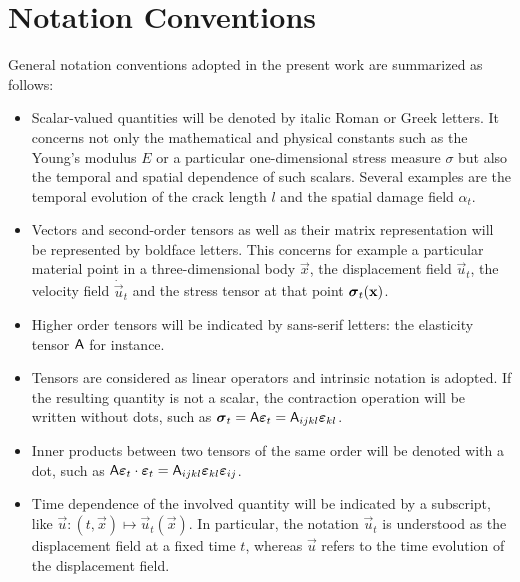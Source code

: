 \section*{Notation Conventions}
General notation conventions adopted in the present work are summarized as follows:
\begin{itemize}
\item Scalar-valued quantities will be denoted by italic Roman or Greek letters. It concerns not only the mathematical and physical constants such as the Young's modulus $E$ or a particular one-dimensional stress measure $\sigma$ but also the temporal and spatial dependence of such scalars. Several examples are the temporal evolution of the crack length $l$ and the spatial damage field $\alpha_t$.

\item Vectors and second-order tensors as well as their matrix representation will be represented by boldface letters. This concerns for example a particular material point in a three-dimensional body $\vec{x}$, the displacement field $\vec{u}_t$, the velocity field $\dot{\vec{u}}_t$ and the stress tensor at that point $\sig_t(\vec{x})$.

\item Higher order tensors will be indicated by sans-serif letters: the elasticity tensor $\mathsf{A}$ for instance.

\item Tensors are considered as linear operators and intrinsic notation is adopted. If the resulting quantity is not a scalar, the contraction operation will be written without dots, such as $\sig_t=\tens{A}\eps_t=\tens{A}_{ijkl}\eps_{kl}$.

\item Inner products between two tensors of the same order will be denoted with a dot, such as $\tens{A}\eps_t\cdot\eps_t=\tens{A}_{ijkl}\eps_{kl}\eps_{ij}$.

\item Time dependence of the involved quantity will be indicated by a subscript, like $\vec{u}:(t,\vec{x})\mapsto\vec{u}_t(\vec{x})$. In particular, the notation $\vec{u}_t$ is understood as the displacement field at a fixed time $t$, whereas $\vec{u}$ refers to the time evolution of the displacement field.
\end{itemize}